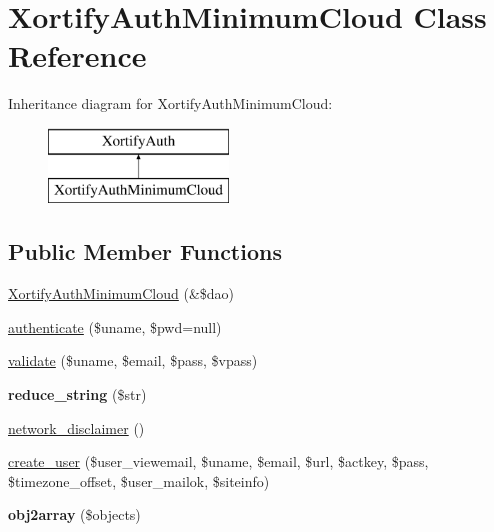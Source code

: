 \hypertarget{class_xortify_auth_minimum_cloud}{\section{Xortify\-Auth\-Minimum\-Cloud Class Reference}
\label{class_xortify_auth_minimum_cloud}
}
Inheritance diagram for Xortify\-Auth\-Minimum\-Cloud\-:\begin{figure}[H]
\begin{center}
\leavevmode
\includegraphics[height=2.000000cm]{class_xortify_auth_minimum_cloud}
\end{center}
\end{figure}
\subsection*{Public Member Functions}
\begin{DoxyCompactItemize}
\item 
\hyperlink{class_xortify_auth_minimum_cloud_a8c0f101b350bdaf235649ff1074fa409}{Xortify\-Auth\-Minimum\-Cloud} (\&\$dao)
\item 
\hyperlink{class_xortify_auth_minimum_cloud_a2381e4f8147a481221882c5ae9c8ff6a}{authenticate} (\$uname, \$pwd=null)
\item 
\hyperlink{class_xortify_auth_minimum_cloud_a439c75891aa72a080e69c7715b879b65}{validate} (\$uname, \$email, \$pass, \$vpass)
\item 
\hypertarget{class_xortify_auth_minimum_cloud_a9d75ac1a90e1a97bdb96c43fb8ca500a}{{\bfseries reduce\-\_\-string} (\$str)}\label{class_xortify_auth_minimum_cloud_a9d75ac1a90e1a97bdb96c43fb8ca500a}

\item 
\hyperlink{class_xortify_auth_minimum_cloud_a24f655562ffe65c2f82be0aa979a40dd}{network\-\_\-disclaimer} ()
\item 
\hyperlink{class_xortify_auth_minimum_cloud_a0634b61de417df79d507f80c676b162d}{create\-\_\-user} (\$user\-\_\-viewemail, \$uname, \$email, \$url, \$actkey, \$pass, \$timezone\-\_\-offset, \$user\-\_\-mailok, \$siteinfo)
\item 
\hypertarget{class_xortify_auth_minimum_cloud_aa8a93d2514105135420ce2fb810fc4f5}{{\bfseries obj2array} (\$objects)}\label{class_xortify_auth_minimum_cloud_aa8a93d2514105135420ce2fb810fc4f5}

\end{DoxyCompactItemize}
